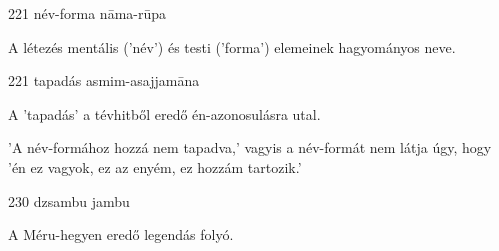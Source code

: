 
\begin{notesdescription}

\item[{221}
{név-forma}
{nāma-rūpa}] \hfill\par

A létezés mentális ('név') és testi ('forma') elemeinek hagyományos neve.

\item[{221}
{tapadás}
{asmim-asajjamāna}] \hfill\par

A 'tapadás' a tévhitből eredő én-azonosulásra utal.

'A név-formához hozzá nem tapadva,' vagyis a név-formát nem látja úgy, hogy 'én ez vagyok, ez az enyém, ez hozzám tartozik.'

\item[{230}
{dzsambu}
{jambu}] \hfill\par

A Méru-hegyen eredő legendás folyó.

\end{notesdescription}

